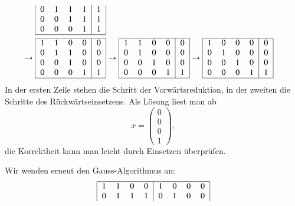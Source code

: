 \begin{loesung}
\begin{teilaufgaben}
\begin{align*}
\begin{tabular}{|>{$}c<{$}>{$}c<{$}>{$}c<{$}>{$}c<{$}|>{$}c<{$}|}
   0 & 1 & 1 & 1 &  1\\
   0 & 0 & 1 & 1 &  1\\
   0 & 0 & 0 & 1 &  1\\
\hline
\end{tabular}
\\
\to
\begin{tabular}{|>{$}c<{$}>{$}c<{$}>{$}c<{$}>{$}c<{$}|>{$}c<{$}|}
\hline
   1 & 1 & 0 & 0 &  0\\
   0 & 1 & 1 & 0 &  0\\
   0 & 0 & 1 & 0 &  0\\
   0 & 0 & 0 & 1 &  1\\
\hline
\end{tabular}
&
\to
\begin{tabular}{|>{$}c<{$}>{$}c<{$}>{$}c<{$}>{$}c<{$}|>{$}c<{$}|}
\hline
   1 & 1 & 0 & 0 &  0\\
   0 & 1 & 0 & 0 &  0\\
   0 & 0 & 1 & 0 &  0\\
   0 & 0 & 0 & 1 &  1\\
\hline
\end{tabular}
\to
\begin{tabular}{|>{$}c<{$}>{$}c<{$}>{$}c<{$}>{$}c<{$}|>{$}c<{$}|}
\hline
   1 & 0 & 0 & 0 &  0\\
   0 & 1 & 0 & 0 &  0\\
   0 & 0 & 1 & 0 &  0\\
   0 & 0 & 0 & 1 &  1\\
\hline
\end{tabular}
\end{align*}
In der ersten Zeile stehen die Schritt der Vorwärtsreduktion, in der
zweiten die Schritte des Rückwärtseinsetzens.
Als Lösung liest man ab
\[
x=\begin{pmatrix}0\\0\\0\\1 \end{pmatrix},
\]
die Korrektheit kann man leicht durch Einsetzen überprüfen.
\item
Wir wenden erneut den Gauss-Algorithmus an:
\begin{align*}
\begin{tabular}{|>{$}c<{$}>{$}c<{$}>{$}c<{$}>{$}c<{$}|>{$}c<{$}>{$}c<{$}>{$}c<{$}>{$}c<{$}|}
\hline
   1 & 1 & 0 & 0 &  1 & 0 & 0 & 0 \\
   0 & 1 & 1 & 1 &  0 & 1 & 0 & 0 \\

\end{tabular}
\end{align*}
\end{teilaufgaben}
\end{loesung}
